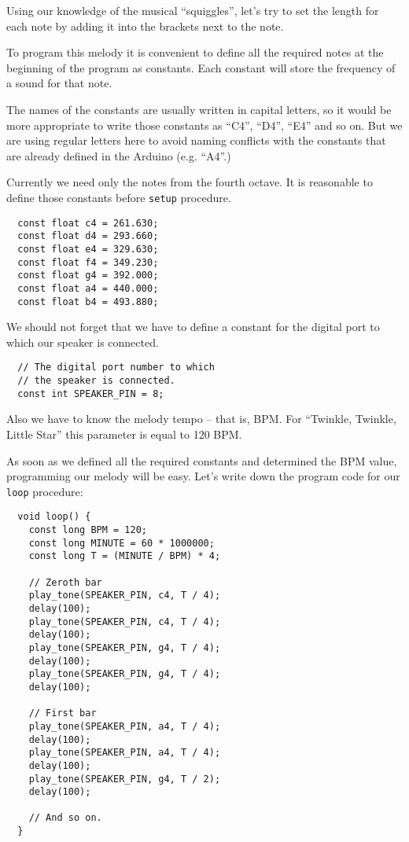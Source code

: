 \documentclass[../sparc.tex]{subfiles}
\begin{document}
Using our knowledge of the musical ``squiggles'', let's try to set the length
for each note by adding it into the brackets next to the note.


To program this melody it is convenient to define all the required notes at the
beginning of the program as constants.  Each constant will store the frequency
of a sound for that note.

The names of the constants are usually written in capital letters, so it would
be more appropriate to write those constants as ``C4'', ``D4'', ``E4'' and so
on.  But we are using regular letters here to avoid naming conflicts with the
constants that are already defined in the Arduino (e.g. ``A4''.)

Currently we need only the notes from the fourth octave.  It is reasonable to
define those constants before \texttt{setup} procedure.

\begin{verbatim}
  const float c4 = 261.630;
  const float d4 = 293.660;
  const float e4 = 329.630;
  const float f4 = 349.230;
  const float g4 = 392.000;
  const float a4 = 440.000;
  const float b4 = 493.880;
\end{verbatim}

We should not forget that we have to define a constant for the digital port to
which our speaker is connected.

\begin{verbatim}
  // The digital port number to which
  // the speaker is connected.
  const int SPEAKER_PIN = 8;
\end{verbatim}

Also we have to know the melody tempo -- that is, \gls{BPM}.  For ``Twinkle,
Twinkle, Little Star'' this parameter is equal to 120 BPM.

As soon as we defined all the required constants and determined the BPM value,
programming our melody will be easy.  Let's write down the program code for our
\texttt{loop} procedure:

\begin{verbatim}
  void loop() {
    const long BPM = 120;
    const long MINUTE = 60 * 1000000;
    const long T = (MINUTE / BPM) * 4;

    // Zeroth bar
    play_tone(SPEAKER_PIN, c4, T / 4);
    delay(100);
    play_tone(SPEAKER_PIN, c4, T / 4);
    delay(100);
    play_tone(SPEAKER_PIN, g4, T / 4);
    delay(100);
    play_tone(SPEAKER_PIN, g4, T / 4);
    delay(100);

    // First bar
    play_tone(SPEAKER_PIN, a4, T / 4);
    delay(100);
    play_tone(SPEAKER_PIN, a4, T / 4);
    delay(100);
    play_tone(SPEAKER_PIN, g4, T / 2);
    delay(100);

    // And so on.
  }
\end{verbatim}
\end{document}
